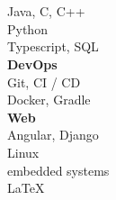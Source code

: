 \begin{smashminipageleft}
	\begin{center}
		\mypic
		\mycontact
		\\
		\smallbreak
		\textbf{}\\
		Java, C, C++\\
		Python \\
		Typescript, SQL \\
		\bigbreak
		\textbf{DevOps}\\
		Git, CI / CD \\
		Docker, Gradle \\
		\bigbreak
		\textbf{Web}\\
		Angular, Django
		\bigbreak
		\textbf{}\\
		Linux\\
		embedded systems\\
		\LaTeX \\
		\bigbreak
		\bigbreak
	\end{center}
	\vfill
\end{smashminipageleft}
%
\hfill
